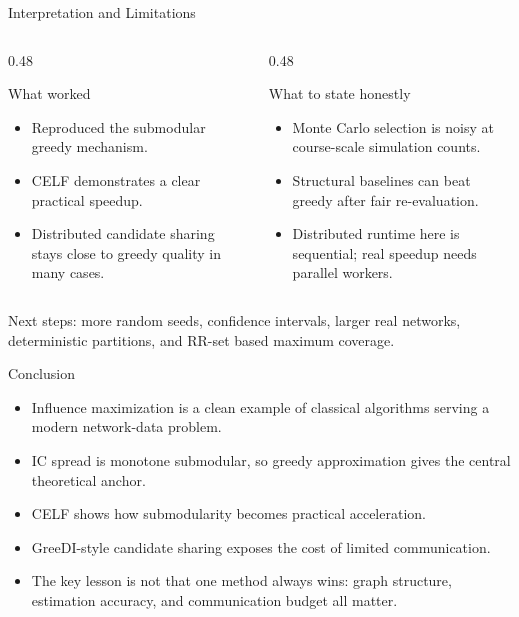 \documentclass[10pt, aspectratio=169]{beamer}
\begin{document}
\begin{frame}{Interpretation and Limitations}
    \begin{columns}[T,onlytextwidth]
        \begin{column}{0.48\linewidth}
            \begin{block}{What worked}
                \begin{itemize}
                    \item Reproduced the submodular greedy mechanism.
                    \item CELF demonstrates a clear practical speedup.
                    \item Distributed candidate sharing stays close to greedy quality in many cases.
                \end{itemize}
            \end{block}
        \end{column}
        \begin{column}{0.48\linewidth}
            \begin{block}{What to state honestly}
                \begin{itemize}
                    \item Monte Carlo selection is noisy at course-scale simulation counts.
                    \item Structural baselines can beat greedy after fair re-evaluation.
                    \item Distributed runtime here is sequential; real speedup needs parallel workers.
                \end{itemize}
            \end{block}
        \end{column}
    \end{columns}
    \vspace{0.4em}
    \small Next steps: more random seeds, confidence intervals, larger real networks, deterministic partitions, and RR-set based maximum coverage.
\end{frame}

\begin{frame}{Conclusion}
    \begin{itemize}
        \item Influence maximization is a clean example of classical algorithms serving a modern network-data problem.
        \item IC spread is monotone submodular, so greedy approximation gives the central theoretical anchor.
        \item CELF shows how submodularity becomes practical acceleration.
        \item GreeDI-style candidate sharing exposes the cost of limited communication.
        \item The key lesson is not that one method always wins: graph structure, estimation accuracy, and communication budget all matter.
    \end{itemize}
\end{frame}
\end{document}
